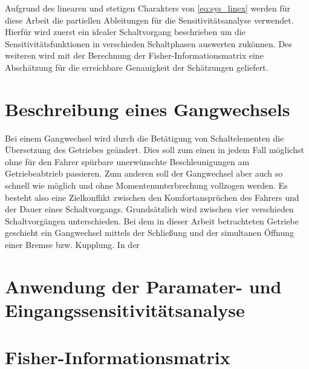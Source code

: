 Aufgrund des linearen und stetigen Charakters von \eqref{eq:sys_linex} werden für diese Arbeit die partiellen Ableitungen für die Sensitivitätsanalyse verwendet.
Hierfür wird zuerst ein idealer Schaltvorgang beschrieben um die Sensitivitätsfunktionen in verschieden Schaltphasen auswerten zukönnen. Des weiteren wird mit der Berechnung der Fisher-Informationsmatrix eine Abschätzung für die erreichbare Genauigkeit der Schätzungen geliefert.
   
\section{Beschreibung eines Gangwechsels}
Bei einem Gangwechsel wird durch die Betätigung von Schaltelementen die Übersetzung des Getriebes geändert. Dies soll zum einen in jedem Fall möglichst ohne für den Fahrer spürbare unerwünschte Beschleunigungen am Getriebeabtrieb passieren. Zum anderen soll der Gangwechsel aber auch so schnell wie möglich und ohne Momentenunterbrechung vollzogen werden. Es besteht also eine Zielkonflikt zwischen den Komfortansprüchen des Fahrers und der Dauer eines Schaltvorgangs. Grundsätzlich wird zwischen vier verschieden Schaltvorgängen unterschieden. 
Bei dem in dieser Arbeit betrachteten Getriebe geschieht ein Gangwechsel mittels der Schließung und der simultanen Öffnung einer Bremse bzw. Kupplung. In der   
\section{Anwendung der Paramater- und Eingangssensitivitätsanalyse}

\section{Fisher-Informationsmatrix}





